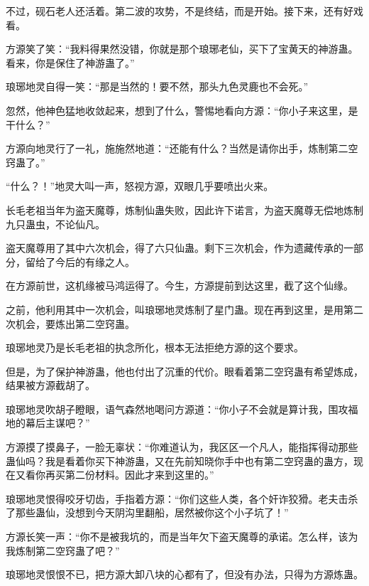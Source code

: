 \begin{this_body}
不过，砚石老人还活着。第二波的攻势，不是终结，而是开始。接下来，还有好戏看。

方源笑了笑：“我料得果然没错，你就是那个琅琊老仙，买下了宝黄天的神游蛊。看来，你是保住了神游蛊了。”

琅琊地灵自得一笑：“那是当然的！要不然，那头九色灵鹿也不会死。”

忽然，他神色猛地收敛起来，想到了什么，警惕地看向方源：“你小子来这里，是干什么？”

方源向地灵行了一礼，施施然地道：“还能有什么？当然是请你出手，炼制第二空窍蛊了。”

“什么？！”地灵大叫一声，怒视方源，双眼几乎要喷出火来。

长毛老祖当年为盗天魔尊，炼制仙蛊失败，因此许下诺言，为盗天魔尊无偿地炼制九只蛊虫，不论仙凡。

盗天魔尊用了其中六次机会，得了六只仙蛊。剩下三次机会，作为遗藏传承的一部分，留给了今后的有缘之人。

在方源前世，这机缘被马鸿运得了。今生，方源提前到达这里，截了这个仙缘。

之前，他利用其中一次机会，叫琅琊地灵炼制了星门蛊。现在再到这里，是用第二次机会，要炼出第二空窍蛊。

琅琊地灵乃是长毛老祖的执念所化，根本无法拒绝方源的这个要求。

但是，为了保护神游蛊，他也付出了沉重的代价。眼看着第二空窍蛊有希望炼成，结果被方源截胡了。

琅琊地灵吹胡子瞪眼，语气森然地喝问方源道：“你小子不会就是算计我，围攻福地的幕后主谋吧？”

方源摸了摸鼻子，一脸无辜状：“你难道认为，我区区一个凡人，能指挥得动那些蛊仙吗？我是看着你买下神游蛊，又在先前知晓你手中也有第二空窍蛊的蛊方，现在又看你再买第二份材料。因此才来到这里的。”

琅琊地灵恨得咬牙切齿，手指着方源：“你们这些人类，各个奸诈狡猾。老夫击杀了那些蛊仙，没想到今天阴沟里翻船，居然被你这个小子坑了！”

方源长笑一声：“你不是被我坑的，而是当年欠下盗天魔尊的承诺。怎么样，该为我炼制第二空窍蛊了吧？”

琅琊地灵恨恨不已，把方源大卸八块的心都有了，但没有办法，只得为方源炼蛊。

\end{this_body}

